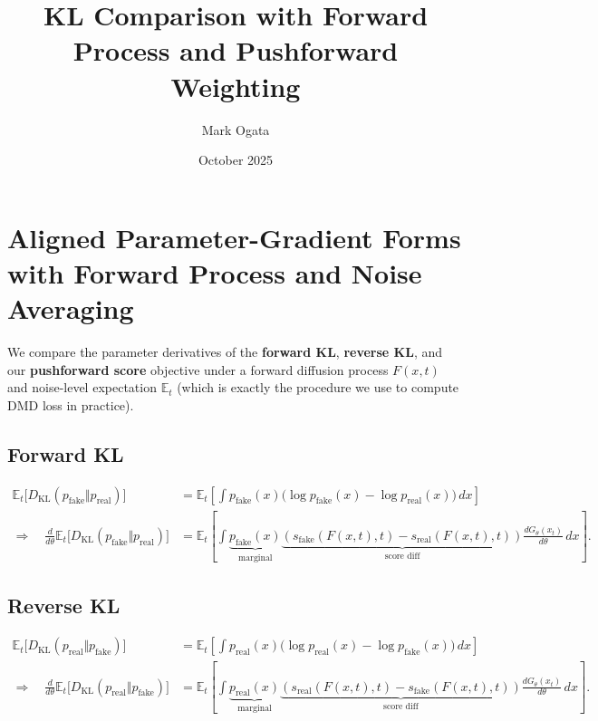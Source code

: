 \documentclass{article}
\title{KL Comparison with Forward Process and Pushforward Weighting}
\author{Mark Ogata}
\date{October 2025}
\begin{document}
\maketitle

\section{Aligned Parameter-Gradient Forms with Forward Process and Noise Averaging}

We compare the parameter derivatives of the \textbf{forward KL}, \textbf{reverse KL}, and our \textbf{pushforward score} objective
under a forward diffusion process $F(x,t)$ and noise-level expectation $\mathbb{E}_t$ (which is exactly the procedure we use to compute DMD loss in practice).

\subsection*{Forward KL}
\begin{align*}
\mathbb{E}_{t}\!\Big[
  D_{\mathrm{KL}}(p_{\mathrm{fake}}\Vert p_{\mathrm{real}})
\Big]
&= 
\mathbb{E}_{t}\!\left[
  \int p_{\mathrm{fake}}(x)
  \big(\log p_{\mathrm{fake}}(x) - \log p_{\mathrm{real}}(x)\big)\,dx
\right] \\[2mm]
\Rightarrow\quad
\frac{d}{d\theta}
\mathbb{E}_{t}\!\Big[D_{\mathrm{KL}}(p_{\mathrm{fake}}\Vert p_{\mathrm{real}})\Big]
&= 
\mathbb{E}_{t}\!\left[
  \int 
  \underbrace{p_{\mathrm{fake}}(x)}_{\text{marginal}}
  \underbrace{(s_{\mathrm{fake}}(F(x,t),t) - s_{\mathrm{real}}(F(x,t),t))}_{\text{score diff}}
  \frac{dG_\theta(x_t)}{d\theta}\,dx
\right].
\end{align*}

\subsection*{Reverse KL}
\begin{align*}
\mathbb{E}_{t}\!\Big[
  D_{\mathrm{KL}}(p_{\mathrm{real}}\Vert p_{\mathrm{fake}})
\Big]
&= 
\mathbb{E}_{t}\!\left[
  \int p_{\mathrm{real}}(x)
  \big(\log p_{\mathrm{real}}(x) - \log p_{\mathrm{fake}}(x)\big)\,dx
\right] \\[2mm]
\Rightarrow\quad
\frac{d}{d\theta}
\mathbb{E}_{t}\!\Big[D_{\mathrm{KL}}(p_{\mathrm{real}}\Vert p_{\mathrm{fake}})\Big]
&= 
\mathbb{E}_{t}\!\left[
  \int
  \underbrace{p_{\mathrm{real}}(x)}_{\text{marginal}}
  \underbrace{(s_{\mathrm{real}}(F(x,t),t) - s_{\mathrm{fake}}(F(x,t),t))}_{\text{score diff}}
  \frac{dG_\theta(x_t)}{d\theta}\,dx
\right].
\end{align*}
\end{document}
